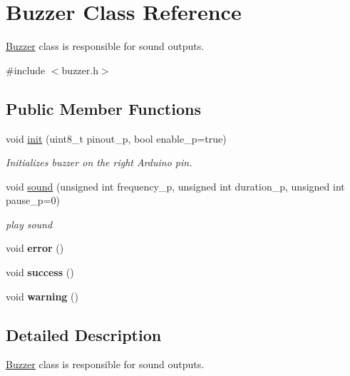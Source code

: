 \hypertarget{class_buzzer}{}\section{Buzzer Class Reference}
\label{class_buzzer}


\hyperlink{class_buzzer}{Buzzer} class is responsible for sound outputs.  




{\ttfamily \#include $<$buzzer.\+h$>$}

\subsection*{Public Member Functions}
\begin{DoxyCompactItemize}
\item 
void \hyperlink{class_buzzer_a55547bbb6c553f9a6f7a1d97eea4bf21}{init} (uint8\+\_\+t pinout\+\_\+p, bool enable\+\_\+p=true)
\begin{DoxyCompactList}\small\item\em Initializes buzzer on the right Arduino pin. \end{DoxyCompactList}\item 
void \hyperlink{class_buzzer_a29cb886294e260705b437dea524d43e8}{sound} (unsigned int frequency\+\_\+p, unsigned int duration\+\_\+p, unsigned int pause\+\_\+p=0)
\begin{DoxyCompactList}\small\item\em play sound \end{DoxyCompactList}\item 
\mbox{\label{class_buzzer_a84c33234bf71806d631e1a939d649438}} 
void {\bfseries error} ()
\item 
\mbox{\label{class_buzzer_a9d9c6ae9bd4993d9b34a96c5ae60b5ed}} 
void {\bfseries success} ()
\item 
\mbox{\label{class_buzzer_a90e969d3ca0c6300d7639bf650cf0f79}} 
void {\bfseries warning} ()
\end{DoxyCompactItemize}


\subsection{Detailed Description}
\hyperlink{class_buzzer}{Buzzer} class is responsible for sound outputs. 

